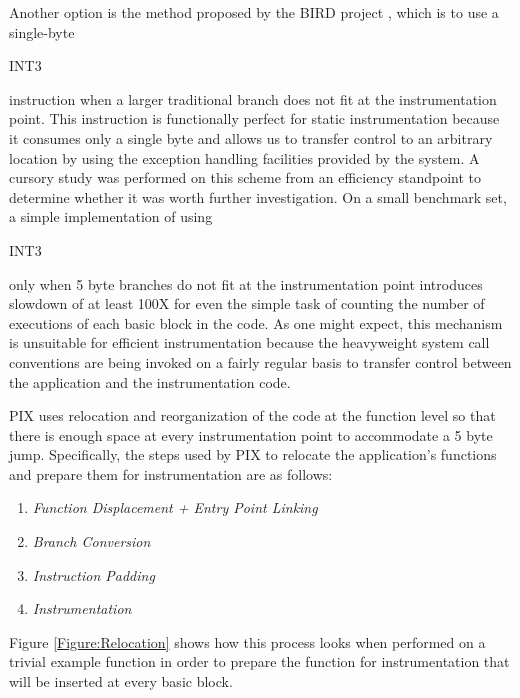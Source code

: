Another option is the method proposed by the BIRD project \cite{nanda2006bird}, which
is to use a single-byte \begin{it}INT3\end{it} instruction when a larger traditional
branch does not fit at the instrumentation point. This instruction is functionally
perfect for static instrumentation because it consumes only a single byte and
allows us to transfer control to an arbitrary location by using the exception handling
facilities provided by the system. A cursory study was performed on this scheme
from an efficiency standpoint to determine whether it was worth further
investigation. On a small benchmark set, a simple implementation of using
\begin{it}INT3\end{it} only when 5 byte branches do not fit at
the instrumentation point introduces slowdown of at least 100X for
even the simple task of counting the number of executions of each basic block in the code. As one might
expect, this mechanism is unsuitable for efficient instrumentation because the
heavyweight system call conventions are being invoked on a fairly regular basis to
transfer control between the application and the instrumentation code.

PIX uses relocation and reorganization of the code at the function level so that
there is enough space at every instrumentation point to accommodate a 5 byte
jump. Specifically, the steps used by PIX to relocate the application's functions and prepare them
for instrumentation are as follows:

\begin{enumerate}
 \item \textit{Function Displacement + Entry Point Linking}
 \item \textit{Branch Conversion}
 \item \textit{Instruction Padding}
 \item \textit{Instrumentation}
\end{enumerate}

Figure \ref{Figure:Relocation} shows how this process looks when performed on 
a trivial example function in order to prepare the function for instrumentation
that will be inserted at every basic block.

